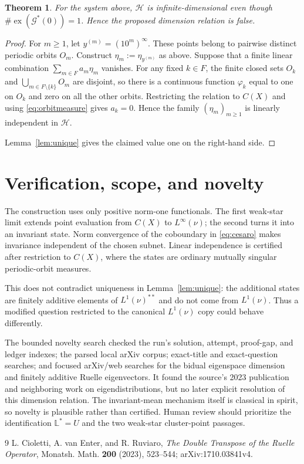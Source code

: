 \documentclass[11pt]{article}
\newtheorem{theorem}{Theorem}
\newcommand{\Bop}{\mathbb L}
\newcommand{\G}{\mathcal G}
\newcommand{\Hspace}{\mathcal H}
\begin{document}
\begin{theorem}\label{thm:counterexample}
For the system above, $\Hspace$ is infinite-dimensional even though
$\#\operatorname{ex}(\G^*(0))=1$.  Hence the proposed dimension relation is
false.
\end{theorem}

\begin{proof}
For $m\ge1$, let $y^{(m)}=(10^m)^{\infty}$.  These points belong to pairwise
distinct periodic orbits $O_m$.  Construct $\eta_m:=\eta_{y^{(m)}}$ as
above.  Suppose that a finite linear combination
$\sum_{m\in F}a_m\eta_m$ vanishes.  For any fixed $k\in F$, the finite
closed sets $O_k$ and $\bigcup_{m\in F\setminus\{k\}}O_m$ are disjoint, so
there is a continuous function $\varphi_k$ equal to one on $O_k$ and zero on
all the other orbits.  Restricting the relation to $C(X)$ and using
\eqref{eq:orbitmeasure} gives $a_k=0$.  Hence the family $(\eta_m)_{m\ge1}$
is linearly independent in $\Hspace$.

Lemma~\ref{lem:unique} gives the claimed value one on the right-hand side.
\end{proof}

\section{Verification, scope, and novelty}

The construction uses only positive norm-one functionals.  The first weak-star
limit extends point evaluation from $C(X)$ to $L^\infty(\nu)$; the second
turns it into an invariant state.  Norm convergence of the coboundary in
\eqref{eq:cesaro} makes invariance independent of the chosen subnet.  Linear
independence is certified after restriction to $C(X)$, where the states are
ordinary mutually singular periodic-orbit measures.

This does not contradict uniqueness in Lemma~\ref{lem:unique}: the additional
states are finitely additive elements of $L^1(\nu)^{**}$ and do not come from
$L^1(\nu)$.  Thus a modified question restricted to the canonical
$L^1(\nu)$ copy could behave differently.

The bounded novelty search checked the run's solution, attempt, proof-gap,
and ledger indexes; the parsed local arXiv corpus; exact-title and
exact-question searches; and focused arXiv/web searches for the bidual
eigenspace dimension and finitely additive Ruelle eigenvectors.  It found the
source's 2023 publication and neighboring work on eigendistributions, but no
later explicit resolution of this dimension relation.  The invariant-mean
mechanism itself is classical in spirit, so novelty is plausible rather than
certified.  Human review should prioritize the identification
$\Bop^*=U$ and the two weak-star cluster-point passages.

\begin{thebibliography}{9}
L. Cioletti, A. van Enter, and R. Ruviaro,
\emph{The Double Transpose of the Ruelle Operator},
Monatsh. Math. \textbf{200} (2023), 523--544;
arXiv:1710.03841v4.
\end{thebibliography}
\end{document}
